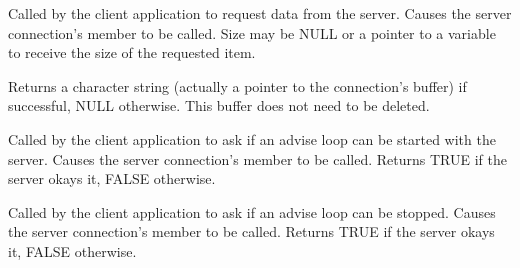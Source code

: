 Called by the client application to request data from the server.
Causes the server connection's  
member to be called. Size may be NULL or a pointer to a variable
to receive the size of the requested item.

Returns a character string (actually a pointer to the
connection's buffer) if successful, NULL otherwise. This buffer
does not need to be deleted.

\label{wxddeconnectionstartadvise}


Called by the client application to ask if an advise loop can be
started with the server. Causes the server connection's 
\rtfsp
member to be called. Returns TRUE if the server okays it, FALSE
otherwise.

\label{wxddeconnectionstopadvise}


Called by the client application to ask if an advise loop can be
stopped. Causes the server connection's  
member to be called. Returns TRUE if the server okays it, FALSE
otherwise.

